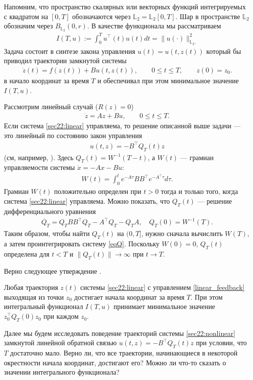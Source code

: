 \documentclass[../main.tex]{subfiles}
\begin{document}
Напомним, что пространство скалярных или векторных функций интегрируемых с квадратом  на $ [0,T] $ обозначаются через $ \mathbb{L}_2 = \mathbb{L}_2[0,T] $. Шар в пространстве $\mathbb{L}_2$ обозначим через $B_{\mathbb{L}_2}(0,r)$. В качестве функционала мы рассматриваем 
\begin{gather}\label{cost}
		I(T,u):=\int_0^Tu^\top (t)u(t)dt= 	\lVert u(\cdot)\rVert^2_{\mathbb{L}_2.} 
\end{gather}
Задача состоит в синтезе закона управления $u(t)=u(t,z(t))$ который бы приводил траектории замкнутой системы  
\begin{gather*}
	\dot{z}(t)=f(z(t))+B u(t,z(t)),\qquad 0 \leqslant t \leqslant T, \qquad z(0) = z_0.
\end{gather*}
в начало координат за время $T$ и обеспечивал при этом минимальное значение $I(T,u)$. 

Рассмотрим линейный случай ($R(z)=0$)
\begin{gather}\label{sec22:linear}
	\dot{z} =  A  z + B u, \qquad 0 \leqslant t \leqslant T.
\end{gather}
Если система \eqref{sec22:linear} управляема, то решение описанной выше задачи --- это линейный по состоянию закон управления 
\begin{gather}\label{linear_feedback}
	u(t,z) = -B^{\top} Q_T(t) z
\end{gather}
(см, например, \cite{Abgar,Kur1,GusevOsipov}).
Здесь $Q_T(t)=W^{-1}(T-t)$, а $W(t)$ --- грамиан управляемости системы $\dot{x} = -A x - B u$:
\begin{gather*}
    W(t) = \int_0^t e^{-A\tau}BB^\top e^{-A^{\top}\tau}d\tau. 
\end{gather*}
Грамиан $W(t)$ положительно определен при $t>0$ тогда и только того, когда   
система \eqref{sec22:linear} управляема. Можно показать, что $Q_T(t)$ --- решение дифференциального уравнения 
\begin{gather}\label{eqQ}
	\dot{Q_T}  = Q_T B B^{\top} Q_T - A^{\top}Q_T - Q_T A, \quad Q_T(0)=W^{-1}(T).
\end{gather}
Таким образом, чтобы найти $Q_T(t)$ на $(0,T]$, нужно сначала вычислить $W(T)$, а затем проинтегрировать систему \eqref{eqQ}.
Поскольку $W(0)=0$, $Q_T(t)$ определена для $t<T$ и $\|Q_T(t)\| \to \infty$ при $t\to T$. 

Верно следующее утверждение \cite{Abgar,Kur1,GusevOsipov}.
\begin{utv}
Любая траектория $z(t)$ системы \eqref{sec22:linear} с управлением  \eqref{linear_feedback} выходящая из точки  $ z_0 $ достигает начала координат за время $T$. При этом интегральный функционал $I(T,u)$ принимает минимальное значение $z^{\top}_0 Q_T(0) z_0 $ при каждом $z_0$.
\end{utv}
Далее мы будем исследовать поведение траекторий системы \eqref{sec22:nonlinear} замкнутой линейной обратной связью $ u(t,z) = -B^{\top} Q_T(t) z$ при условии, что  $T$ достаточно мало. 
Верно ли, что все траектории, начинающиеся в некоторой окрестности начала координат, достигают его?  
Можно ли что-то сказать о значении интегрального функционала? 
\end{document}
